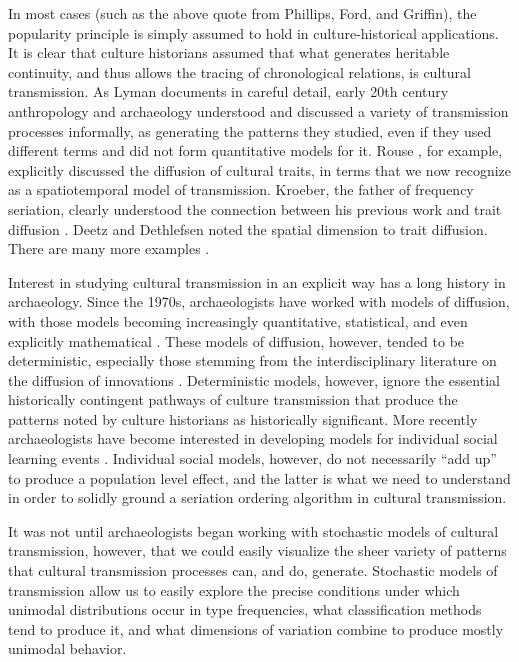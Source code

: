 In most cases (such as the above quote from Phillips, Ford, and
Griffin), the popularity principle is simply assumed to hold in
culture-historical applications. It is clear that culture historians
assumed that what generates heritable continuity, and thus allows the
tracing of chronological relations, is cultural transmission. As Lyman
\citeyearpar{Lyman2008} documents in careful detail, early 20th century
anthropology and archaeology understood and discussed a variety of
transmission processes informally, as generating the patterns they
studied, even if they used different terms and did not form quantitative
models for it. Rouse \citeyearpar{Rouse1939}, for example, explicitly
discussed the diffusion of cultural traits, in terms that we now
recognize as a spatiotemporal model of transmission. Kroeber, the father
of frequency seriation, clearly understood the connection between his
previous work and trait diffusion \citep{kroeber1937diffusion}. Deetz
and Dethlefsen \citetext{\citeyear{Deetz1965a}; \citeyear{Deetz1971}}
noted the spatial dimension to trait diffusion. There are many more
examples \citep{Lyman2008}.

Interest in studying cultural transmission in an explicit way has a long
history in archaeology. Since the 1970s, archaeologists have worked with
models of diffusion, with those models becoming increasingly
quantitative, statistical, and even explicitly mathematical
\citep[e.g.,][]{ammerman1971measuring}. These models of diffusion,
however, tended to be deterministic, especially those stemming from the
interdisciplinary literature on the diffusion of innovations
\citep[e.g.,][]{Rogers2003}. Deterministic models, however, ignore the
essential historically contingent pathways of culture transmission that
produce the patterns noted by culture historians as historically
significant. More recently archaeologists have become interested in
developing models for individual social learning events
\citep[e.g.,][]{Mesoudi2008}. Individual social models, however, do not
necessarily ``add up'' to produce a population level effect, and the
latter is what we need to understand in order to solidly ground a
seriation ordering algorithm in cultural transmission.

It was not until archaeologists began working with stochastic models of
cultural transmission, however, that we could easily visualize the sheer
variety of patterns that cultural transmission processes can, and do,
generate. Stochastic models of transmission allow us to easily explore
the precise conditions under which unimodal distributions occur in type
frequencies, what classification methods tend to produce it, and what
dimensions of variation combine to produce mostly unimodal behavior.

